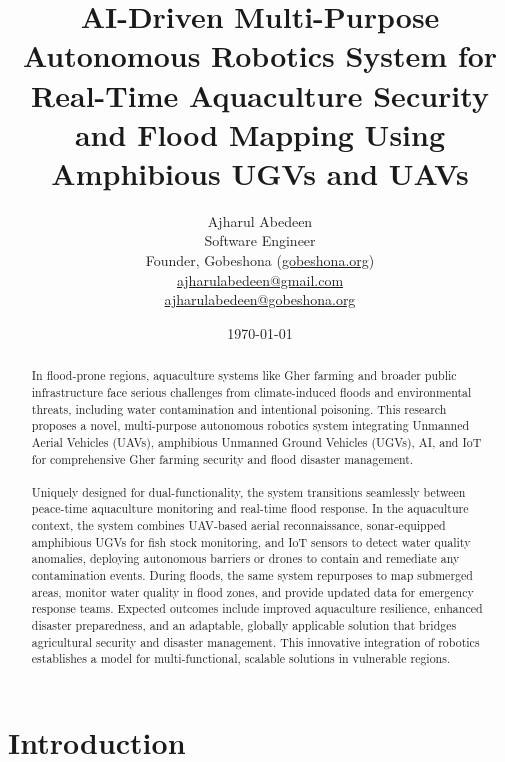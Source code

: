 \documentclass[conference]{IEEEtran}
\begin{document}
\title{AI-Driven Multi-Purpose Autonomous Robotics System for Real-Time Aquaculture Security and Flood Mapping Using Amphibious UGVs and UAVs}

\author{
    Ajharul Abedeen \\
    Software Engineer \\
    Founder, Gobeshona (\url{gobeshona.org}) \\
    \href{mailto:ajharulabedeen@gmail.com}{ajharulabedeen@gmail.com} \\
    \href{mailto:ajharulabedeen@gobeshona.org}{ajharulabedeen@gobeshona.org}
}

\date{\today}

\maketitle

\begin{abstract}
In flood-prone regions, aquaculture systems like Gher farming and broader public infrastructure face serious challenges from climate-induced floods and environmental threats, including water contamination and intentional poisoning. This research proposes a novel, multi-purpose autonomous robotics system integrating Unmanned Aerial Vehicles (UAVs), amphibious Unmanned Ground Vehicles (UGVs), AI, and IoT for comprehensive Gher farming security and flood disaster management. 
\\\\Uniquely designed for dual-functionality, the system transitions seamlessly between peace-time aquaculture monitoring and real-time flood response. In the aquaculture context, the system combines UAV-based aerial reconnaissance, sonar-equipped amphibious UGVs for fish stock monitoring, and IoT sensors to detect water quality anomalies, deploying autonomous barriers or drones to contain and remediate any contamination events. During floods, the same system repurposes to map submerged areas, monitor water quality in flood zones, and provide updated data for emergency response teams. Expected outcomes include improved aquaculture resilience, enhanced disaster preparedness, and an adaptable, globally applicable solution that bridges agricultural security and disaster management. This innovative integration of robotics establishes a model for multi-functional, scalable solutions in vulnerable regions.
\end{abstract}

\section{\textbf{Introduction}}
\end{document}
